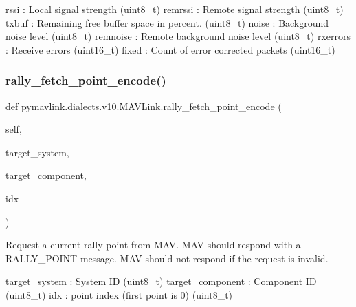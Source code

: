 \begin{DoxyVerb}
\begin{DoxyVerb}
\begin{DoxyVerb}
\begin{DoxyVerb}
\begin{DoxyVerb}
rssi                      : Local signal strength (uint8_t)
remrssi                   : Remote signal strength (uint8_t)
txbuf                     : Remaining free buffer space in percent. (uint8_t)
noise                     : Background noise level (uint8_t)
remnoise                  : Remote background noise level (uint8_t)
rxerrors                  : Receive errors (uint16_t)
fixed                     : Count of error corrected packets (uint16_t)\end{DoxyVerb}
 \mbox{\label{classpymavlink_1_1dialects_1_1v10_1_1MAVLink_a828fdb86aff28a72c260cfb872e81877}} 
\subsubsection{\texorpdfstring{rally\+\_\+fetch\+\_\+point\+\_\+encode()}{rally\_fetch\_point\_encode()}}
{\footnotesize\ttfamily def pymavlink.\+dialects.\+v10.\+M\+A\+V\+Link.\+rally\+\_\+fetch\+\_\+point\+\_\+encode (\begin{DoxyParamCaption}\item[{}]{self,  }\item[{}]{target\+\_\+system,  }\item[{}]{target\+\_\+component,  }\item[{}]{idx }\end{DoxyParamCaption})}

\begin{DoxyVerb}Request a current rally point from MAV. MAV should respond with a
RALLY_POINT message. MAV should not respond if the
request is invalid.

target_system             : System ID (uint8_t)
target_component          : Component ID (uint8_t)
idx                       : point index (first point is 0) (uint8_t)\end{DoxyVerb}
 \mbox{\label{classpymavlink_1_1dialects_1_1v10_1_1MAVLink_af21c36bfa469654c60cb125c27fd54a4}} 

\end{DoxyVerb}
\end{DoxyVerb}
\end{DoxyVerb}
\end{DoxyVerb}
